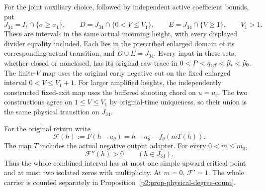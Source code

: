 \begin{proposition}
\label{p2:prop-finite-v-fe-actual-budget}
For the joint auxiliary choice, followed by independent active
coefficient bounds, put
\[
 J_{34}=I_\ell\cap\{\sigma\ge\sigma_1\},\qquad
 D=J_{34}\cap\{0<V\le V_1\},\qquad
 E=J_{34}\cap\{V\ge1\},\qquad V_1>1 .
 \tag{FVFE3}
\]
These are intervals in the same actual incoming height, with every
displayed divider equality included. Each lies in the prescribed
enlarged domain of its corresponding actual transition, and
\(D\cup E=J_{34}\). Every input in these sets, whether
closed or nonclosed, has its original raw trace in
\(0<P<q_{\rm ref}<\widehat p_*<\widehat p_0\).
The finite-\(V\) map uses the original early negative cut on
the fixed enlarged interval \(0<V\le V_1+1\). For larger amplified
heights, the independently constructed fixed-exit map uses the buffered
shooting chord on \(u=u_c\). The two
constructions agree on \(1\le V\le V_1\) by original-time
uniqueness, so their union is the same physical transition on \(J_{34}\).

For the original return write
\[
 \mathcal F(h):=F(h-a_\theta)
       =h-a_\theta-f_\theta(mT(h)).
 \tag{FVFE4}
\]
The map \(T\) includes the actual negative output adapter. For every
\(0<m\le m_0\),
\[
 \mathcal F''(h)>0\qquad(h\in J_{34}).
 \tag{FVFE5}
\]
Thus the whole combined interval has at most one simple upward
critical point and at most two isolated zeros with multiplicity.
At $m=0$, $\mathcal F'=1$. The whole carrier is counted separately
in Proposition~\ref{p2:prop-physical-degree-count}.
\end{proposition}

